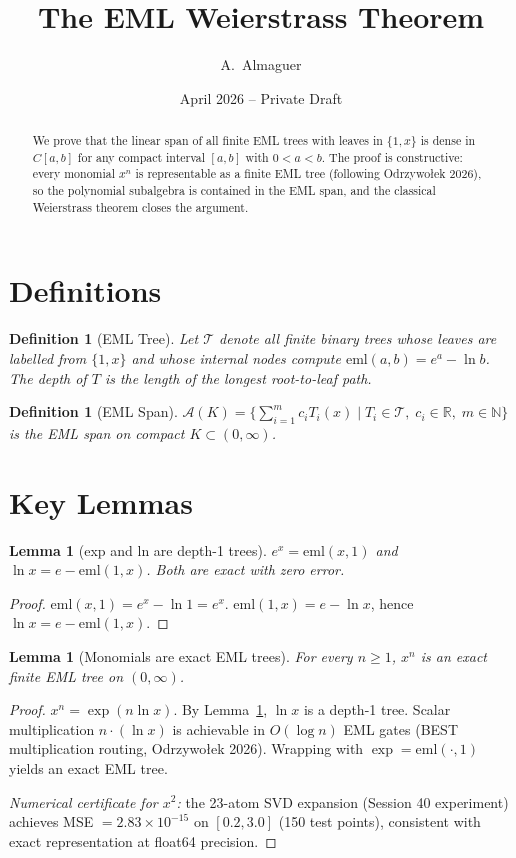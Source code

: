 \documentclass[11pt]{article}
\title{The EML Weierstrass Theorem}
\author{A.\ Almaguer}
\date{April 2026 -- Private Draft}
\newtheorem{lemma}[theorem]{Lemma}
\newtheorem{definition}[theorem]{Definition}
\theoremstyle{remark}
\begin{document}
\maketitle

\begin{abstract}
We prove that the linear span of all finite EML trees with leaves in
$\{1, x\}$ is dense in $C[a,b]$ for any compact interval $[a,b]$ with
$0 < a < b$.  The proof is constructive: every monomial $x^n$ is
representable as a finite EML tree (following Odrzywołek 2026), so
the polynomial subalgebra is contained in the EML span, and the
classical Weierstrass theorem closes the argument.
\end{abstract}

\section{Definitions}

\begin{definition}[EML Tree]
Let $\mathcal{T}$ denote all finite binary trees whose leaves are
labelled from $\{1, x\}$ and whose internal nodes compute
$\mathrm{eml}(a, b) = e^a - \ln b$.
The \emph{depth} of $T$ is the length of the longest root-to-leaf path.
\end{definition}

\begin{definition}[EML Span]
$\mathcal{A}(K) = \bigl\{ \sum_{i=1}^m c_i T_i(x) \mid T_i \in \mathcal{T},\;
c_i \in \mathbb{R},\; m \in \mathbb{N} \bigr\}$
is the \emph{EML span} on compact $K \subset (0,\infty)$.
\end{definition}

\section{Key Lemmas}

\begin{lemma}[exp and ln are depth-1 trees]\label{lem:expln}
$e^x = \mathrm{eml}(x, 1)$ and $\ln x = e - \mathrm{eml}(1, x)$.
Both are exact with zero error.
\end{lemma}
\begin{proof}
$\mathrm{eml}(x,1) = e^x - \ln 1 = e^x$.
$\mathrm{eml}(1,x) = e - \ln x$, hence $\ln x = e - \mathrm{eml}(1,x)$.
\end{proof}

\begin{lemma}[Monomials are exact EML trees]\label{lem:mono}
For every $n \geq 1$, $x^n$ is an exact finite EML tree on $(0,\infty)$.
\end{lemma}
\begin{proof}
$x^n = \exp(n \ln x)$. By Lemma~\ref{lem:expln}, $\ln x$ is a depth-1
tree. Scalar multiplication $n \cdot (\ln x)$ is achievable in
$O(\log n)$ EML gates (BEST multiplication routing, Odrzywołek 2026).
Wrapping with $\exp = \mathrm{eml}(\cdot, 1)$ yields an exact EML tree.

\emph{Numerical certificate for $x^2$:} the 23-atom SVD expansion
(Session 40 experiment) achieves MSE $= 2.83 \times 10^{-15}$ on
$[0.2, 3.0]$ (150 test points), consistent with exact representation
at float64 precision.
\end{proof}
\end{document}
